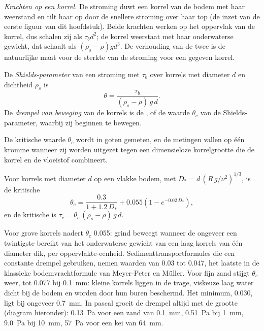 \emph{Krachten op een korrel.} De stroming duwt een korrel van de bodem met haar weerstand en tilt haar op door de snellere stroming over haar top (de inzet van de eerste figuur van dit hoofdstuk). Beide krachten werken op het oppervlak van de korrel, dus schalen zij als $\tau_b
d^2$; de korrel weerstaat met haar onderwaterse gewicht, dat schaalt als $(\rho_s - \rho) g d^3$. De verhouding van de twee is de natuurlijke maat voor de sterkte van de stroming voor een gegeven korrel.

\begin{definition}\label{def:b1:erosion-transport:threshold}
De \emph{Shields-parameter} van een stroming met  $\tau_b$ over korrels met diameter $d$ en dichtheid $\rho_s$ is
\[
  \theta = \frac{\tau_b}{(\rho_s - \rho)\,g\,d}.
\]
De \emph{drempel van beweging} van de korrels is de , of de waarde $\theta_c$ van de Shields-parameter, waarbij zij beginnen te bewegen.
\end{definition}

De kritische waarde $\theta_c$ wordt in goten gemeten, en de metingen vallen op één kromme wanneer zij worden uitgezet tegen een dimensieloze korrelgrootte die de korrel en de vloeistof combineert.

\begin{proposition}\label{prop:b1:erosion-transport:soulsby}
Voor korrels met diameter $d$ op een vlakke bodem, met
$D_* = d\,\left(R\,g/\nu^2\right)^{1/3}$, is de kritische 
\[
  \theta_c = \frac{0.3}{1 + 1.2\,D_*} + 0.055\left(1 - e^{-0.02\,D_*}\right),
\]
en de kritische  is $\tau_c = \theta_c\,(\rho_s - \rho)\,g\,d$.
\end{proposition}
\admitted

Voor grove korrels nadert $\theta_c$ \num{0.055}: grind beweegt wanneer de  ongeveer een twintigste bereikt van het onderwaterse gewicht van een laag korrels van één diameter dik, per oppervlakte-eenheid. Sedimenttransportformules die een constante drempel gebruiken, nemen waarden van \num{0.03} tot \num{0.047}, het laatste in de klassieke bodemvrachtformule van Meyer-Peter en Müller. Voor fijn zand stijgt $\theta_c$ weer, tot \num{0.077} bij \qty{0.1}{mm}: kleine korrels liggen in de trage, viskeuze laag water dicht bij de bodem en worden door hun buren beschermd. Het minimum, \num{0.030}, ligt bij ongeveer \qty{0.7}{mm}. In pascal groeit de drempel altijd met de grootte (diagram hieronder): \qty{0.13}{Pa} voor een zand van \qty{0.1}{mm}, \qty{0.51}{Pa} bij \qty{1}{mm}, \qty{9.0}{Pa} bij \qty{10}{mm}, \qty{57}{Pa} voor een kei van \qty{64}{mm}.


